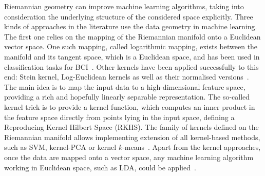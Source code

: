 {%
Riemannian geometry can improve machine learning algorithms, taking into consideration the underlying structure of the considered space explicitly.
Three kinds of approaches in the literature use the data geometry in machine learning. 
The first one relies on the mapping of the Riemannian manifold onto a Euclidean vector space. %
One such mapping, called logarithmic mapping, exists between the manifold and its tangent space, which is a Euclidean space, and has been used in classification tasks for BCI~\citep{barachant2012bci,BAR13}. 
Other kernels have been applied successfully to this end: Stein kernel, Log-Euclidean kernels as well as their normalised versions~\citep{yger2013review}.
The main idea is to map the input data to a high-dimensional feature space, providing a rich and hopefully linearly separable representation.
The so-called kernel trick is to provide a kernel function, which computes an inner product in the feature space directly from points lying in the input space, defining a Reproducing Kernel Hilbert Space (RKHS).
The family of kernels defined on the Riemannian manifold allows implementing extension of all kernel-based methods, such as SVM, kernel-PCA or kernel $k$-means~\citep{jayasumana2013kernel}.
Apart from the kernel approaches, once the data are mapped onto a vector space, any machine learning algorithm working in Euclidean space, such as LDA, could be applied~\citep{barachant2012multiclass}.

}
